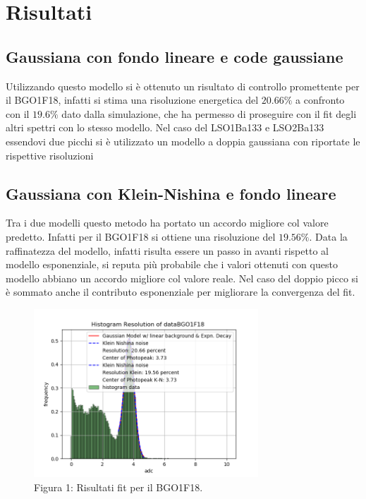 \documentclass[a4paper]{article}
\begin{document}
\section{Risultati}
\subsection{Gaussiana con fondo lineare e code gaussiane}
Utilizzando questo modello si è ottenuto un risultato di controllo promettente per il BGO1F18, infatti si stima una risoluzione energetica del $20.66\%$ a confronto con il $19.6\%$ dato dalla simulazione, che ha permesso di proseguire con il fit degli altri spettri con lo stesso modello. Nel caso del LSO1Ba133 e LSO2Ba133 essendovi due picchi si è utilizzato un modello a doppia gaussiana con riportate le rispettive risoluzioni
\subsection{Gaussiana con Klein-Nishina e fondo lineare}
Tra i due modelli questo metodo ha portato un accordo migliore col valore predetto. Infatti per il BGO1F18 si ottiene una risoluzione del $19.56\%$. Data la raffinatezza del modello, infatti risulta essere un passo in avanti rispetto al modello esponenziale, si reputa più probabile che i valori ottenuti con questo modello abbiano un accordo migliore col valore reale. Nel caso del doppio picco si è sommato anche il contributo esponenziale per migliorare la convergenza del fit.
\begin{figure}[H]
\centering
\includegraphics[width=0.75\textwidth]{histkleindataBGO1F18}
\caption{Figura 1: Risultati fit per il BGO1F18.}
\end{figure}
\end{document}
